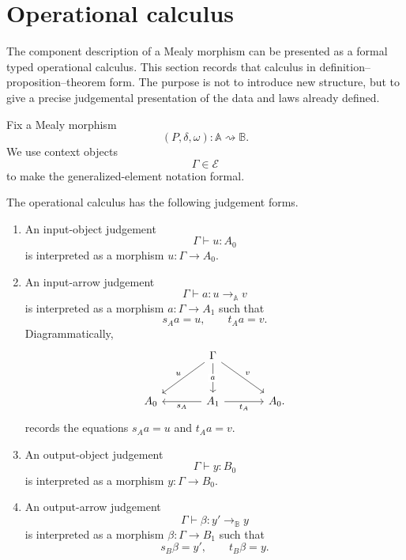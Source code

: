 \section{Operational calculus}
\label{sec:operational-calculus-mealy}

The component description of a Mealy morphism can be presented as a formal
typed operational calculus. This section records that calculus in
definition--proposition--theorem form. The purpose is not to introduce new
structure, but to give a precise judgemental presentation of the data and laws
already defined.

Fix a Mealy morphism
\[
    (P,\delta,\omega):\mathbb A\rightsquigarrow\mathbb B.
\]
We use context objects
\[
    \Gamma\in\mathcal E
\]
to make the generalized-element notation formal.

\begin{definition}[Judgements]
\label{def:mealy-operational-judgements}
    The operational calculus has the following judgement forms.

    \begin{enumerate}
        \item An input-object judgement
        \[
            \Gamma\vdash u:A_0
        \]
        is interpreted as a morphism \(u:\Gamma\to A_0\).

        \item An input-arrow judgement
        \[
            \Gamma\vdash a:u\to_{\mathbb A}v
        \]
        is interpreted as a morphism \(a:\Gamma\to A_1\) such that
        \[
            s_Aa=u,
            \qquad
            t_Aa=v.
        \]
        Diagrammatically,
\[
\begin{tikzcd}[column sep=large, row sep=large]
    &
    \Gamma
        \arrow[d, "a" description]
        \arrow[dl, "u"']
        \arrow[dr, "v"]
    &
    \\
    A_0
    &
    A_1
        \arrow[l, "s_A"]
        \arrow[r, "t_A"']
    &
    A_0 .
\end{tikzcd}
\]
        records the equations \(s_Aa=u\) and \(t_Aa=v\).

        \item An output-object judgement
        \[
            \Gamma\vdash y:B_0
        \]
        is interpreted as a morphism \(y:\Gamma\to B_0\).

        \item An output-arrow judgement
        \[
            \Gamma\vdash \beta:y'\to_{\mathbb B}y
        \]
        is interpreted as a morphism \(\beta:\Gamma\to B_1\) such that
        \[
            s_B\beta=y',
            \qquad
            t_B\beta=y.
        \]


\end{enumerate}
\end{definition}
